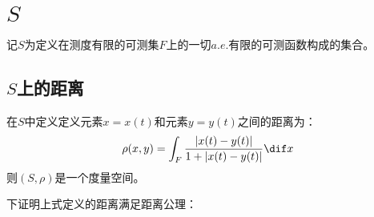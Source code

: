 \section{$S$}

记$S$为定义在测度有限的可测集$F$上的一切$a.e.$有限的可测函数构成的集合。

\subsection{$S$上的距离}
\begin{definition}
	在$S$中定义定义元素$x=x(t)$和元素$y=y(t)$之间的距离为：
	\begin{equation*}
		\rho(x,y)=\int_F\frac{|x(t)-y(t)|}{1+|x(t)-y(t)|}\dif x
	\end{equation*}
	则$(S,\rho)$是一个度量空间。
\end{definition}
下证明上式定义的距离满足距离公理：
